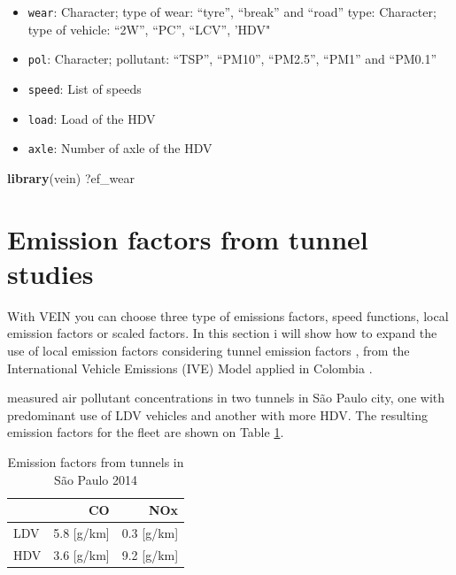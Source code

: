 \documentclass[12pt,graybox,envcountchap,sectrefs]{krantz}
\makeatletter
\newenvironment{Shaded}{\begin{snugshade}}{\end{snugshade}}
\newcommand{\KeywordTok}[1]{\textcolor[rgb]{0.13,0.29,0.53}{\textbf{#1}}}
\newcommand{\NormalTok}[1]{#1}
\providecommand{\tightlist}{%
  \setlength{\itemsep}{0pt}\setlength{\parskip}{0pt}}
\newenvironment{kframe}{%
\medskip{}
\setlength{\fboxsep}{.8em}
 \def\at@end@of@kframe{}%
 \ifinner\ifhmode%
  \def\at@end@of@kframe{\end{minipage}}%
  \begin{minipage}{\columnwidth}%
 \fi\fi%
 \def\FrameCommand##1{\hskip\@totalleftmargin \hskip-\fboxsep
 \colorbox{shadecolor}{##1}\hskip-\fboxsep
     \hskip-\linewidth \hskip-\@totalleftmargin \hskip\columnwidth}%
 \MakeFramed {\advance\hsize-\width
   \@totalleftmargin\z@ \linewidth\hsize
   \@setminipage}}%
 {\par\unskip\endMakeFramed%
 \at@end@of@kframe}
\renewenvironment{Shaded}{\begin{kframe}}{\end{kframe}}
\theoremstyle{definition}
\theoremstyle{definition}
\theoremstyle{definition}
\theoremstyle{remark}
\makeatother
\begin{document}
\begin{itemize}
\tightlist
\item
  \texttt{wear}: Character; type of wear: ``tyre'', ``break'' and
  ``road'' type: Character; type of vehicle: ``2W'', ``PC'', ``LCV'',
  'HDV"
\item
  \texttt{pol}: Character; pollutant: ``TSP'', ``PM10'', ``PM2.5'',
  ``PM1'' and ``PM0.1''
\item
  \texttt{speed}: List of speeds
\item
  \texttt{load}: Load of the HDV
\item
  \texttt{axle}: Number of axle of the HDV
\end{itemize}

\begin{Shaded}
\begin{Highlighting}[]
\KeywordTok{library}\NormalTok{(vein)}
\NormalTok{?ef_wear}
\end{Highlighting}
\end{Shaded}

\section{Emission factors from tunnel
studies}\label{emission-factors-from-tunnel-studies}

With VEIN you can choose three type of emissions factors, speed
functions, local emission factors or scaled factors. In this section i
will show how to expand the use of local emission factors considering
tunnel emission factors \citep{perez2014emission}, from the
International Vehicle Emissions (IVE) Model \citep{Davisetal2005}
applied in Colombia \citep{gonzalez2017relative}.

\citet{perez2014emission} measured air pollutant concentrations in two
tunnels in São Paulo city, one with predominant use of LDV vehicles and
another with more HDV. The resulting emission factors for the fleet are
shown on Table \ref{tab:eftun}.

\begin{table}

\caption{\label{tab:eftun}Emission factors from tunnels in São Paulo 2014}
\centering
\begin{tabular}[t]{lrr}
\toprule
  & CO & NOx\\
\midrule
LDV & 5.8 [g/km] & 0.3 [g/km]\\
HDV & 3.6 [g/km] & 9.2 [g/km]\\
\bottomrule
\end{tabular}
\end{table}
\end{document}

